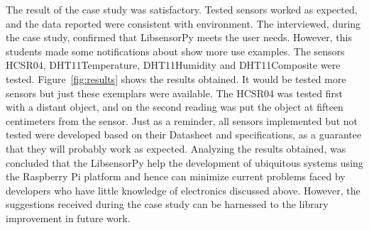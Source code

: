 \documentclass{acm_proc_article-sp}
\begin{document}
The result of the case study was satisfactory. Tested sensors worked as expected, and the data reported were consistent with environment. The interviewed, during the case study, confirmed that LibsensorPy meets the user needs. However, this students made some notifications about show more use examples.
\newline
\newline
The sensors HCSR04, DHT11Temperature, DHT11Humidity and DHT11Composite were tested. Figure~\ref{fig:results} shows the results obtained. It would be tested more sensors but just these exemplars were available. The HCSR04 was tested first with a distant object, and on the second reading was put the object at fifteen centimeters from the sensor. Just as a reminder, all sensors implemented but not tested were developed based on their Datasheet and specifications, as a guarantee that they will probably work as expected.
\newline
\newline
Analyzing the results obtained, was concluded that the LibsensorPy help the development of ubiquitous systems using the Raspberry Pi platform and hence can minimize current problems faced by developers who have little knowledge of electronics discussed above. However, the suggestions received during the case study can be harnessed to the library improvement in future work.
\end{document}
